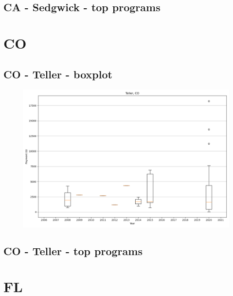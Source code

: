 \subsection*{CA - Sedgwick - top programs}

\newpage
\section*{CO}
\subsection*{CO - Teller - boxplot}
\begin{figure}[h]
\centering
\includegraphics[width=7in]{../output/boxplots/counties/Teller-CO_boxplot.png}
\end{figure}


\subsection*{CO - Teller - top programs}

\newpage
\section*{FL}
